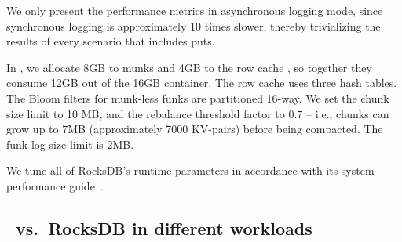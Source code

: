 We only present the performance metrics in asynchronous logging mode, since synchronous logging 
is approximately 10 times slower, thereby trivializing the results of every scenario that includes puts. 

In \sys, we allocate 8GB to munks and 4GB to the row cache , 
so together they consume 12GB out of the 16GB container. 
The row cache uses three hash tables.  
The Bloom filters for munk-less funks are partitioned 16-way.  
We set the \sys\/ chunk size limit to 10 MB, and the rebalance threshold factor to $0.7$ -- i.e., 
chunks can grow up to 7MB  (approximately 7000 KV-pairs) before being compacted. 
The funk log size limit is 2MB. 

We tune all of RocksDB's runtime parameters in accordance with its system performance guide~\cite{RocksDBPerf}.   

\subsection{\sys\ vs.\ RocksDB in different workloads}
\label{ssec:results} 

